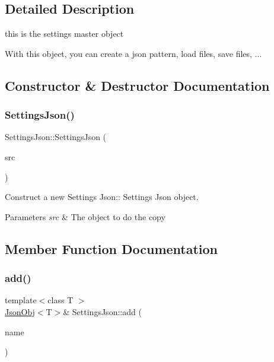 \subsection{Detailed Description}
this is the settings master object 

With this object, you can create a json pattern, load files, save files, ... 

\subsection{Constructor \& Destructor Documentation}
\mbox{\label{class_settings_json_a449a6c3026583d1ee209e6086f663996}} 
\subsubsection{\texorpdfstring{Settings\+Json()}{SettingsJson()}}
{\footnotesize\ttfamily Settings\+Json\+::\+Settings\+Json (\begin{DoxyParamCaption}\item[{\hyperlink{class_settings_json}{Settings\+Json} const \&}]{src }\end{DoxyParamCaption})}



Construct a new Settings Json\+:\+: Settings Json object. 


\begin{DoxyParams}{Parameters}
{\em src} & The object to do the copy \\
\hline
\end{DoxyParams}


\subsection{Member Function Documentation}
\mbox{\label{class_settings_json_ac889f7a07a5819175f963e1ee85da0d6}} 
\subsubsection{\texorpdfstring{add()}{add()}\hspace{0.1cm}{\footnotesize\ttfamily [1/2]}}
{\footnotesize\ttfamily template$<$class T $>$ \\
\hyperlink{class_json_obj}{Json\+Obj}$<$T$>$\& Settings\+Json\+::add (\begin{DoxyParamCaption}\item[{std\+::string const \&}]{name }\end{DoxyParamCaption})\hspace{0.3cm}{\ttfamily [inline]}}



